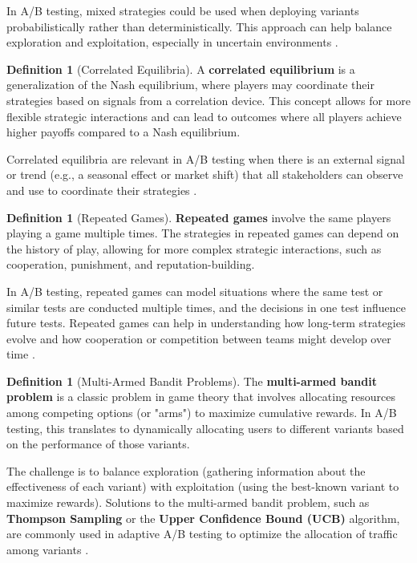 \documentclass[magisterska, english]{pwr_wmat_praca_dyplomowa}
\theoremstyle{plain}
\numberwithin{theorem}{chapter}
\theoremstyle{definition}
\numberwithin{theorem}{chapter}
\newtheorem{definition}[theorem]{Definition}
\begin{document}
In A/B testing, mixed strategies could be used when deploying variants probabilistically rather than deterministically. This approach can help balance exploration and exploitation, especially in uncertain environments \cite{Aumann1974}.


\begin{definition}[Correlated Equilibria]
	A \textbf{correlated equilibrium} is a generalization of the Nash equilibrium, where players may coordinate their strategies based on signals from a correlation device. This concept allows for more flexible strategic interactions and can lead to outcomes where all players achieve higher payoffs compared to a Nash equilibrium.
\end{definition}

Correlated equilibria are relevant in A/B testing when there is an external signal or trend (e.g., a seasonal effect or market shift) that all stakeholders can observe and use to coordinate their strategies \cite{Aumann1987}.


\begin{definition}[Repeated Games]
	\textbf{Repeated games} involve the same players playing a game multiple times. The strategies in repeated games can depend on the history of play, allowing for more complex strategic interactions, such as cooperation, punishment, and reputation-building.
\end{definition}

In A/B testing, repeated games can model situations where the same test or similar tests are conducted multiple times, and the decisions in one test influence future tests. Repeated games can help in understanding how long-term strategies evolve and how cooperation or competition between teams might develop over time \cite{Fudenberg1991}.

\begin{definition}[Multi-Armed Bandit Problems]
	The \textbf{multi-armed bandit problem} is a classic problem in game theory that involves allocating resources among competing options (or "arms") to maximize cumulative rewards. In A/B testing, this translates to dynamically allocating users to different variants based on the performance of those variants.
\end{definition}

The challenge is to balance exploration (gathering information about the effectiveness of each variant) with exploitation (using the best-known variant to maximize rewards). Solutions to the multi-armed bandit problem, such as \textbf{Thompson Sampling} or the \textbf{Upper Confidence Bound (UCB)} algorithm, are commonly used in adaptive A/B testing to optimize the allocation of traffic among variants \cite{Lai1985}.
\end{document}
